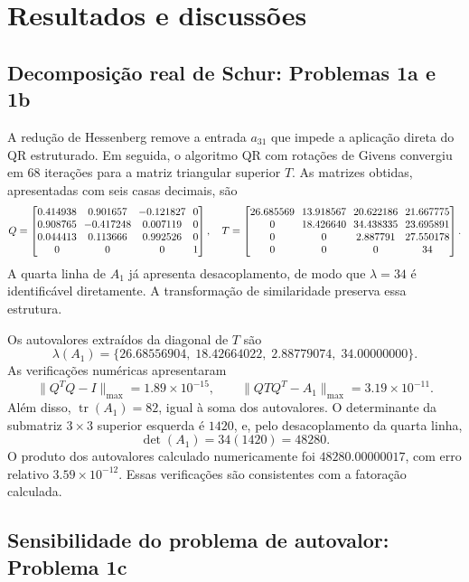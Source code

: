 \section{Resultados e discussões}

\subsection{Decomposição real de Schur: Problemas 1a e 1b}

A redução de Hessenberg remove a entrada \(a_{31}\) que impede a aplicação direta do QR estruturado. Em seguida, o algoritmo QR com rotações de Givens convergiu em 68 iterações para a matriz triangular superior \(T\). As matrizes obtidas, apresentadas com seis casas decimais, são
\begin{equation*}
\setlength{\arraycolsep}{3.5pt}
Q=\begin{bmatrix}
0.414938&0.901657&-0.121827&0\\
0.908765&-0.417248&0.007119&0\\
0.044413&0.113666&0.992526&0\\
0&0&0&1
\end{bmatrix},
\quad
T=\begin{bmatrix}
26.685569&13.918567&20.622186&21.667775\\
0&18.426640&34.438335&23.695891\\
0&0&2.887791&27.550178\\
0&0&0&34
\end{bmatrix}.
\end{equation*}
A quarta linha de \(A_1\) já apresenta desacoplamento, de modo que \(\lambda=34\) é identificável diretamente. A transformação de similaridade preserva essa estrutura.

Os autovalores extraídos da diagonal de \(T\) são
\[
\boxed{\lambda(A_1)=
\{26.68556904,\;18.42664022,\;2.88779074,\;34.00000000\}.}
\]
As verificações numéricas apresentaram
\[
\|Q^TQ-I\|_{\max}=1.89\times10^{-15},\qquad
\|QTQ^T-A_1\|_{\max}=3.19\times10^{-11}.
\]
Além disso, \(\operatorname{tr}(A_1)=82\), igual à soma dos autovalores. O determinante da submatriz \(3\times3\) superior esquerda é \(1420\), e, pelo desacoplamento da quarta linha,
\[
\det(A_1)=34(1420)=48280.
\]
O produto dos autovalores calculado numericamente foi \(48280.00000017\), com erro relativo \(3.59\times10^{-12}\). Essas verificações são consistentes com a fatoração calculada.

\subsection{Sensibilidade do problema de autovalor: Problema 1c}

